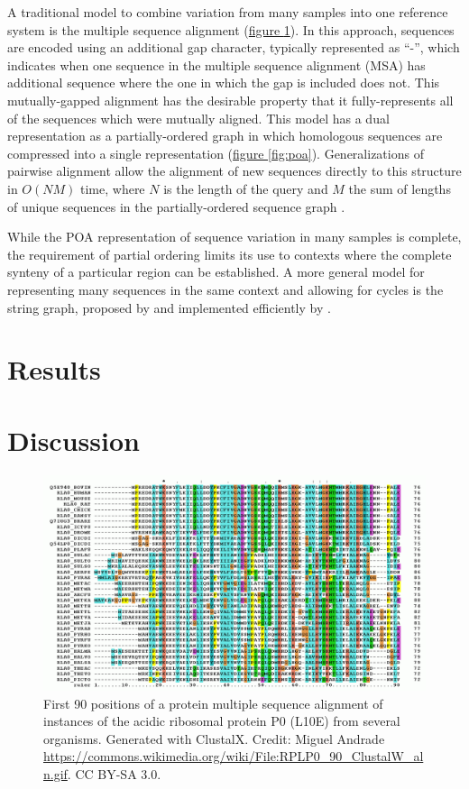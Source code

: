 \documentclass{article}
\begin{document}
A traditional model to combine variation from many samples into one reference system is the multiple sequence alignment (\hyperref[fig:msa]{figure \ref{fig:msa}}). In this approach, sequences are encoded using an additional gap character, typically represented as ``-'', which indicates when one sequence in the multiple sequence alignment (MSA) has additional sequence where the one in which the gap is included does not. This mutually-gapped alignment has the desirable property that it fully-represents all of the sequences which were mutually aligned. This model has a dual representation as a partially-ordered graph in which homologous sequences are compressed into a single representation (\hyperref[fig:poa]{figure \ref{fig:poa}}). Generalizations of pairwise alignment \cite{gotoh1982} allow the alignment of new sequences directly to this structure in $O(NM)$ time, where $N$ is the length of the query and $M$ the sum of lengths of unique sequences in the partially-ordered sequence graph \cite{lee2002POA}.

While the POA representation of sequence variation in many samples is complete, the requirement of partial ordering limits its use to contexts where the complete synteny of a particular region can be established. A more general model for representing many sequences in the same context and allowing for cycles is the string graph, proposed by \cite{myers2005} and implemented efficiently by \cite{simpson2010}.

\section{Results}

\section{Discussion}

{}



\begin{figure}
\centering
\includegraphics[width=1.0\textwidth]{figures/RPLP0_90_ClustalW_aln}
\caption{\label{fig:msa}
  First 90 positions of a protein multiple sequence alignment of instances of the acidic ribosomal protein P0 (L10E) from several organisms. Generated with ClustalX. Credit: Miguel Andrade \url{https://commons.wikimedia.org/wiki/File:RPLP0_90_ClustalW_aln.gif}. CC BY-SA 3.0.
}
\end{figure}
\end{document}
